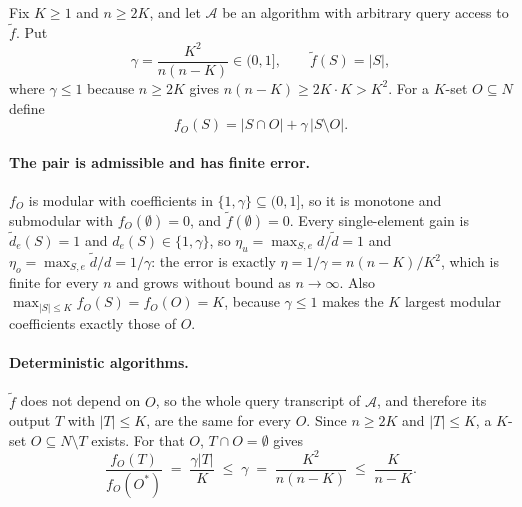 Fix $K\ge1$ and $n\ge2K$, and let $\mathcal A$ be an algorithm with arbitrary
query access to $\tilde f$.  Put
\[
  \gamma=\frac{K^{2}}{n(n-K)}\in(0,1],\qquad
  \tilde f(S)=|S| ,
\]
where $\gamma\le1$ because $n\ge2K$ gives $n(n-K)\ge 2K\cdot K>K^{2}$.  For a
$K$-set $O\subseteq N$ define
\[
  f_O(S)=|S\cap O|+\gamma\,|S\setminus O| .
\]

\paragraph{The pair is admissible and has finite error.}
$f_O$ is modular with coefficients in $\{1,\gamma\}\subseteq(0,1]$, so it is
monotone and submodular with $f_O(\emptyset)=0$, and $\tilde f(\emptyset)=0$.
Every single-element gain is $\tilde d_e(S)=1$ and $d_e(S)\in\{1,\gamma\}$, so
$\eta_u=\max_{S,e}d/\tilde d=1$ and $\eta_o=\max_{S,e}\tilde d/d=1/\gamma$: the
error is exactly $\eta=1/\gamma=n(n-K)/K^{2}$, which is finite for every $n$
and grows without bound as $n\to\infty$.  Also
$\max_{|S|\le K}f_O(S)=f_O(O)=K$, because $\gamma\le1$ makes the $K$ largest
modular coefficients exactly those of $O$.

\paragraph{Deterministic algorithms.}
$\tilde f$ does not depend on $O$, so the whole query transcript of
$\mathcal A$, and therefore its output $T$ with $|T|\le K$, are the same for
every $O$.  Since $n\ge2K$ and $|T|\le K$, a $K$-set $O\subseteq N\setminus T$
exists.  For that $O$, $T\cap O=\emptyset$ gives
\[
  \frac{f_O(T)}{f_O(O^{\ast})}\;=\;\frac{\gamma|T|}{K}\;\le\;\gamma
  \;=\;\frac{K^{2}}{n(n-K)}\;\le\;\frac{K}{n-K} .
\]

